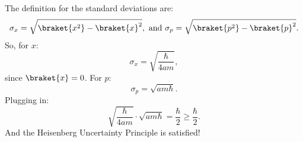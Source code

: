 \begin{parts}
    \item The definition for the standard deviations are:
        \begin{equation}
            \sigma_x = \sqrt{\braket{x^2} - \braket{x}^2},\ \text{and}\ \sigma_p = \sqrt{\braket{p^2} - \braket{p}^2}.
        \end{equation}
        So, for $x$:
        \begin{equation*}
            \sigma_x = \sqrt{\frac{\hbar}{4am}},
        \end{equation*}
        since $\braket{x} = 0$. For $p$:    
        \begin{equation*}
            \sigma_p = \sqrt{am\hbar}.
        \end{equation*}
        Plugging in:
        \begin{equation*}
            \sqrt{\frac{\hbar}{4am}}\cdot\sqrt{am\hbar} = \frac{\hbar}{2} \geq \frac{\hbar}{2}.
        \end{equation*}
        And the Heisenberg Uncertainty Principle is satisfied!
\end{parts}
